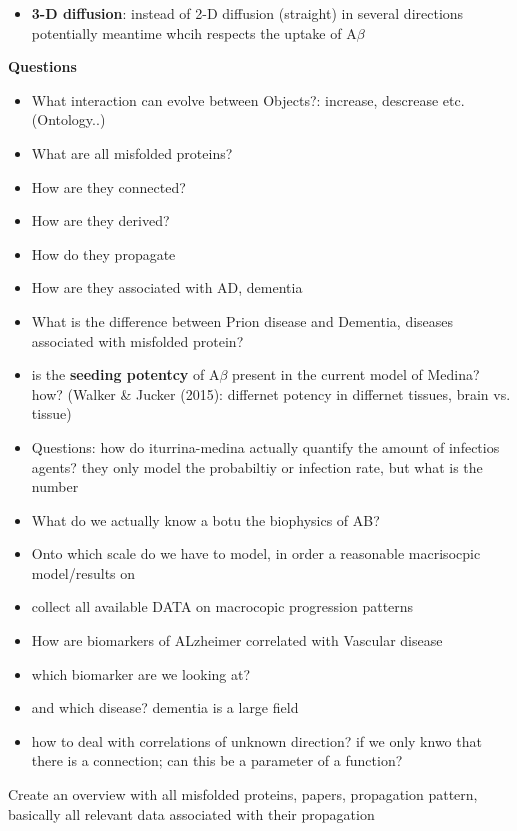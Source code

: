 \documentclass[fleqn]{article}\usepackage{caption}
\begin{document}
\begin{itemize}
\begin{itemize}
\item \textbf{3-D diffusion}: instead of 2-D diffusion (straight) in several directions potentially meantime whcih respects the uptake of A$\beta$

\end{itemize}
\end{itemize}


\textbf{Questions}
\begin{itemize}
\item What interaction can evolve between Objects?: increase, descrease etc. (Ontology..)
\item What are all misfolded proteins?
\item How are they connected?
\item How are they derived?
\item How do they propagate
\item How are they associated with AD, dementia
\item What is the difference between Prion disease and Dementia, diseases associated with misfolded protein?
\item is the \textbf{seeding potentcy} of A$\beta$ present in the current model of Medina? how? (Walker \& Jucker (2015): differnet potency in differnet tissues, brain vs. tissue)
\item Questions: how do iturrina-medina actually quantify the amount of infectios agents? they only model the probabiltiy or infection rate, but what is the number
\item What do we actually know a botu the biophysics of AB?
\item Onto which scale do we have to model, in order a reasonable macrisocpic model/results on 
\item collect all available DATA on macrocopic progression patterns
\item How are biomarkers of ALzheimer correlated with Vascular disease
\item which biomarker are we looking at? 
\item and which disease? dementia is a large field
\item how to deal with correlations of unknown direction? if we only knwo that there is a connection; can this be a parameter of a function?
\end{itemize}



Create an overview with all misfolded proteins, papers, propagation pattern, basically all relevant data associated with their propagation
\end{document}
